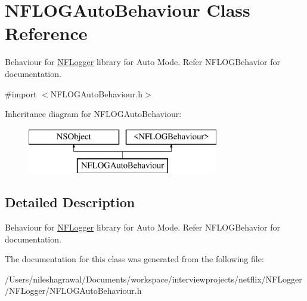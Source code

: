 \hypertarget{interface_n_f_l_o_g_auto_behaviour}{}\section{N\+F\+L\+O\+G\+Auto\+Behaviour Class Reference}
\label{interface_n_f_l_o_g_auto_behaviour}


Behaviour for \hyperlink{interface_n_f_logger}{N\+F\+Logger} library for Auto Mode. Refer N\+F\+L\+O\+G\+Behavior for documentation.  




{\ttfamily \#import $<$N\+F\+L\+O\+G\+Auto\+Behaviour.\+h$>$}

Inheritance diagram for N\+F\+L\+O\+G\+Auto\+Behaviour\+:\begin{figure}[H]
\begin{center}
\leavevmode
\includegraphics[height=2.000000cm]{interface_n_f_l_o_g_auto_behaviour}
\end{center}
\end{figure}


\subsection{Detailed Description}
Behaviour for \hyperlink{interface_n_f_logger}{N\+F\+Logger} library for Auto Mode. Refer N\+F\+L\+O\+G\+Behavior for documentation. 

The documentation for this class was generated from the following file\+:\begin{DoxyCompactItemize}
\item 
/\+Users/nileshagrawal/\+Documents/workspace/interviewprojects/netflix/\+N\+F\+Logger/\+N\+F\+Logger/N\+F\+L\+O\+G\+Auto\+Behaviour.\+h\end{DoxyCompactItemize}
